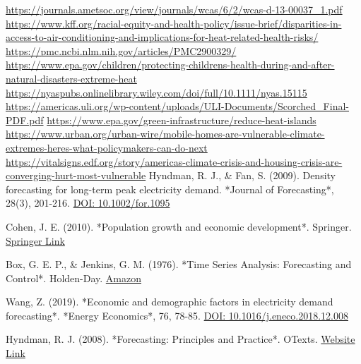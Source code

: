 \documentclass[12pt]{article}
\begin{document}
\begin{thebibliography}{56}
\url{https://journals.ametsoc.org/view/journals/wcas/6/2/wcas-d-13-00037_1.pdf
}
\url{https://www.kff.org/racial-equity-and-health-policy/issue-brief/disparities-in-access-to-air-conditioning-and-implications-for-heat-related-health-risks/}
\url{https://pmc.ncbi.nlm.nih.gov/articles/PMC2900329/}
\url{https://www.epa.gov/children/protecting-childrens-health-during-and-after-natural-disasters-extreme-heat}
\url{https://nyaspubs.onlinelibrary.wiley.com/doi/full/10.1111/nyas.15115}
\url{https://americas.uli.org/wp-content/uploads/ULI-Documents/Scorched_Final-PDF.pdf}
\url{https://www.epa.gov/green-infrastructure/reduce-heat-islands}
\url{https://www.urban.org/urban-wire/mobile-homes-are-vulnerable-climate-extremes-heres-what-policymakers-can-do-next}
\url{https://vitalsigns.edf.org/story/americas-climate-crisis-and-housing-crisis-are-converging-hurt-most-vulnerable}
 Hyndman, R. J., \& Fan, S. (2009). Density forecasting for long-term peak electricity demand. *Journal of Forecasting*, 28(3), 201-216. \href{https://doi.org/10.1002/for.1095}{DOI: 10.1002/for.1095}

 Cohen, J. E. (2010). *Population growth and economic development*. Springer. \href{https://link.springer.com/book/10.1007/978-1-4419-5773-4}{Springer Link}

 Box, G. E. P., \& Jenkins, G. M. (1976). *Time Series Analysis: Forecasting and Control*. Holden-Day. \href{https://www.amazon.com/Time-Series-Analysis-Forecasting-Control/dp/081623711X}{Amazon}

 Wang, Z. (2019). *Economic and demographic factors in electricity demand forecasting*. *Energy Economics*, 76, 78-85. \href{https://doi.org/10.1016/j.eneco.2018.12.008}{DOI: 10.1016/j.eneco.2018.12.008}

 Hyndman, R. J. (2008). *Forecasting: Principles and Practice*. OTexts. \href{https://otexts.com/fpp3/}{Website Link}

\end{thebibliography}
\end{document}
